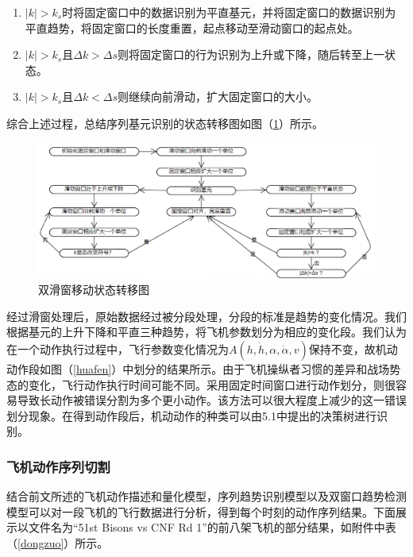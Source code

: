 \documentclass{my_paper}
\begin{document}
\begin{enumerate}
    \item $|k|>k_s$时将固定窗口中的数据识别为平直基元，并将固定窗口的数据识别为平直趋势，将固定窗口的长度重置，起点移动至滑动窗口的起点处。
    \item $|k|>k_s$且$\Delta k > \Delta s$则将固定窗口的行为识别为上升或下降，随后转至上一状态。
    \item $|k|>k_s$且$\Delta k < \Delta s$则继续向前滑动，扩大固定窗口的大小。
\end{enumerate}

综合上述过程，总结序列基元识别的状态转移图如图（\ref{slide}）所示。

\begin {figure}[h]
\centering %
\includegraphics[width=\textwidth]{slide.png}
\caption{双滑窗移动状态转移图} %
\label{slide}
\end {figure}

经过滑窗处理后，原始数据经过被分段处理，分段的标准是趋势的变化情况。我们根据基元的上升下降和平直三种趋势，将飞机参数划分为相应的变化段。我们认为在一个动作执行过程中，飞行参数变化情况为$A(h,\dot{h},\alpha,\dot{\alpha},v )$保持不变，故机动动作段如图（\ref{huafen}）中划分的结果所示。由于飞机操纵者习惯的差异和战场势态的变化，飞行动作执行时间可能不同。采用固定时间窗口进行动作划分，则很容易导致长动作被错误分割为多个更小动作。该方法可以很大程度上减少的这一错误划分现象。在得到动作段后，机动动作的种类可以由5.1中提出的决策树进行识别。


\subsubsection{飞机动作序列切割}

结合前文所述的飞机动作描述和量化模型，序列趋势识别模型以及双窗口趋势检测模型可以对一段飞机的飞行数据进行分析，得到每个时刻的动作序列结果。下面展示以文件名为“51st Bisons vs CNF Rd 1”的前八架飞机的部分结果，如附件中表（\ref{dongzuo}）所示。
\end{document}
